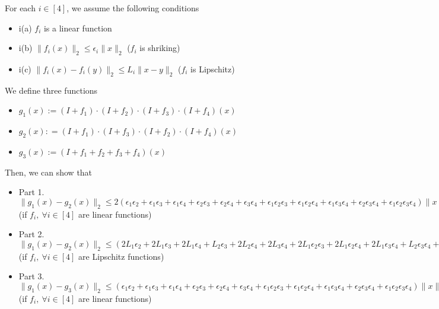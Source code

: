 \begin{lemma}
For each $i \in [4]$, we assume the following conditions
\begin{itemize}
    \item i(a) $f_i$ is a linear function
    \item i(b) $\| f_i(x) \|_2 \leq \epsilon_i \| x \|_2$ ($f_i$ is shriking)
    \item i(c)  $\| f_i(x) - f_i(y) \|_2 \leq L_i \| x-y\|_2$ ($f_i$ is Lipschitz)
\end{itemize}
We define three functions
\begin{itemize}
    \item $g_1(x):= (I+ f_1) \cdot (I + f_2) \cdot (I + f_3) \cdot (I + f_4) (x)$
    \item $g_2(x): = (I+ f_1) \cdot (I + f_3) \cdot (I + f_2) \cdot (I + f_4) (x)$
    \item $g_3(x) := (I + f_1 + f_2 + f_3 + f_4) (x)$
\end{itemize}
Then, we can show that
\begin{itemize}
    \item Part 1. $\| g_1 (x) - g_2 (x ) \|_2 \leq 2 ( \epsilon_1 \epsilon_2+ \epsilon_1 \epsilon_3 + \epsilon_1 \epsilon_4
        +\epsilon_2\epsilon_3+ \epsilon_2 \epsilon_4
        +\epsilon_3 \epsilon_4 
         + \epsilon_1 \epsilon_2 \epsilon_3 + \epsilon_1 \epsilon_2 \epsilon_4 + \epsilon_1 \epsilon_3 \epsilon_4 +\epsilon_2 \epsilon_3 \epsilon_4 + \epsilon_1 \epsilon_2 \epsilon_3 \epsilon_4) \|x\|_2$ (if $f_i,~\forall i \in [4]$ are linear functions)
    \item Part 2. $\| g_1 (x) - g_2 (x ) \|_2  \leq (2L_1 \epsilon_2  + 2L_1 \epsilon_3  +2L_1 \epsilon_4   +
        L_2 \epsilon_3  + 2L_2  \epsilon_4  + 2L_3  \epsilon_4  +
        2L_1 \epsilon_2 \epsilon_3  +2L_1 \epsilon_2 \epsilon_4   +2L_1 \epsilon_3 \epsilon_4 +
         L_2 \epsilon_3 \epsilon_4  +
        2L_1 \epsilon_2 \epsilon_3 \epsilon_4 + 
         L_3 \epsilon_2 +
          L_3 \epsilon_2 \epsilon_4) \| x\|_2$ (if $f_i,~\forall i \in [4]$ are Lipschitz functions)
    \item Part 3. $\| g_1 (x) - g_3 (x ) \|_2 \leq ( \epsilon_1 \epsilon_2+ \epsilon_1 \epsilon_3 + \epsilon_1 \epsilon_4
        +\epsilon_2\epsilon_3+ \epsilon_2 \epsilon_4
        +\epsilon_3 \epsilon_4 
         + \epsilon_1 \epsilon_2 \epsilon_3 + \epsilon_1 \epsilon_2 \epsilon_4 + \epsilon_1 \epsilon_3 \epsilon_4 +\epsilon_2 \epsilon_3 \epsilon_4 + \epsilon_1 \epsilon_2 \epsilon_3 \epsilon_4) \|x\|_2$ (if $f_i,~\forall i \in [4]$ are linear functions)

\end{itemize}
\end{lemma}
